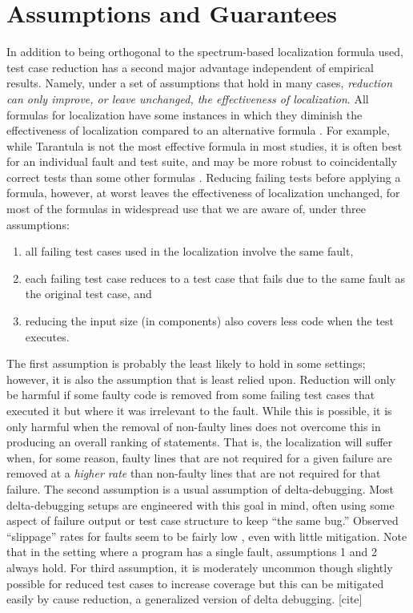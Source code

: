 \section{Assumptions and Guarantees}
\label{formal}

In addition to being orthogonal to the spectrum-based localization
formula used, test case reduction has a second major advantage
independent of empirical results.  Namely, under a set of assumptions
that hold in many cases, \emph{reduction can only improve, or leave
unchanged, the effectiveness of localization}.  All formulas for
localization have some instances in which they diminish the
effectiveness of localization compared to an alternative formula
\cite{yoo2014no}. For example, while Tarantula is not the most
effective formula in most studies, it is often best for an
individual fault and test suite, and may be more robust to
coincidentally correct tests than some other formulas \cite{CCT}.
Reducing failing tests before applying a formula, however, at worst
leaves the effectiveness of localization unchanged, for most of the
formulas in widespread use that we are aware of, under three
assumptions:

\begin{enumerate}
\item all failing test cases used in the localization involve the same
fault,
\item each failing test case reduces to a test case that fails due to the same fault as the original test case, and
\item reducing the input size (in components) also covers less code when the test executes.
\end{enumerate}

The first assumption is probably the least likely to hold in some
settings; however, it is also the assumption that is least relied
upon.  Reduction will only be harmful if some faulty code is removed
from some failing test cases that executed it but where it was
irrelevant to the fault.  While this is possible, it is only harmful
when the removal of non-faulty lines does not overcome this in
producing an overall ranking of statements.  That is, the localization
will suffer when, for some reason, faulty lines that are not required
for a given failure are removed at a \emph{higher rate} than non-faulty lines
that are not required for that failure.  The second assumption is a usual assumption of delta-debugging.  Most
delta-debugging setups are engineered with this goal in mind, often
using some aspect of failure output or test case structure to keep
``the same bug.''  Observed ``slippage'' rates for faults
seem to be fairly low \cite{PLDI13}, even with little mitigation.
Note that in the setting where a program has a single fault,
assumptions 1 and 2 always hold.  For third assumption, it is moderately uncommon though slightly possible for reduced test cases to increase coverage but this can be mitigated easily by cause reduction, a generalized version of delta debugging. [cite] 

